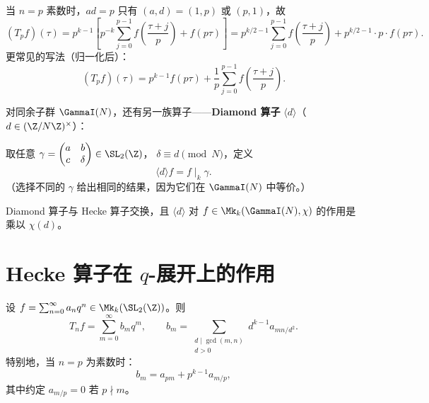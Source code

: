 \begin{example}[$T_p$ 的简洁公式（素数 $p$）]
\label{ex:Tp-formula}
当 $n = p$ 素数时，$ad = p$ 只有 $(a,d) = (1,p)$ 或 $(p,1)$，故
\[
  (T_p f)(\tau) = p^{k-1} \left[
    p^{-k} \sum_{j=0}^{p-1} f\!\left(\frac{\tau+j}{p}\right) + f(p\tau)
  \right]
  = p^{k/2-1}\sum_{j=0}^{p-1} f\!\left(\frac{\tau+j}{p}\right)
    + p^{k/2-1} \cdot p \cdot f(p\tau).
\]
更常见的写法（归一化后）：
\[
  \boxed{(T_p f)(\tau)
  = p^{k-1} f(p\tau) + \frac{1}{p}\sum_{j=0}^{p-1} f\!\left(\frac{\tau+j}{p}\right).}
\]
\end{example}

\begin{definition}[Diamond 算子]
\label{def:diamond-operator}
对同余子群 $\GammaI(N)$，还有另一族算子——\textbf{Diamond 算子}
$\langle d \rangle$（$d \in (\Z/N\Z)^\times$）：

取任意 $\gamma = \begin{pmatrix} a & b \\ c & \delta \end{pmatrix} \in \SL_2(\Z)$，
$\delta \equiv d \pmod N$，定义
\[
  \langle d \rangle f = f \mid_k \gamma.
\]
（选择不同的 $\gamma$ 给出相同的结果，因为它们在 $\GammaI(N)$ 中等价。）

Diamond 算子与 Hecke 算子交换，且 $\langle d \rangle$ 对 $f \in \Mk_k(\GammaI(N), \chi)$
的作用是乘以 $\chi(d)$。
\end{definition}


\section{Hecke 算子在 $q$-展开上的作用}
\label{sec:hecke-on-qexp}

\begin{theorem}
\label{thm:hecke-on-q-exp}
设 $f = \sum_{n=0}^{\infty} a_n q^n \in \Mk_k(\SL_2(\Z))$。则
\[
  T_n f = \sum_{m=0}^{\infty} b_m q^m,
  \qquad b_m = \sum_{\substack{d \mid \gcd(m,n) \\ d > 0}} d^{k-1} a_{mn/d^2}.
\]
特别地，当 $n = p$ 为素数时：
\[
  \boxed{b_m = a_{pm} + p^{k-1} a_{m/p},}
\]
其中约定 $a_{m/p} = 0$ 若 $p \nmid m$。
\end{theorem}



